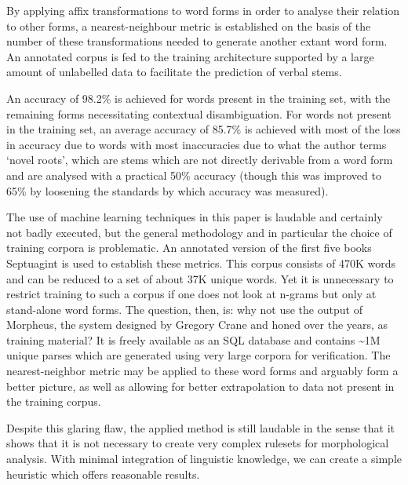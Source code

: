 By applying affix transformations to word forms in order to analyse
their relation to other forms, a nearest-neighbour metric is
established on the basis of the number of these transformations needed
to generate another extant word form. An annotated corpus is fed to
the training architecture supported by a large amount of unlabelled data to
facilitate the prediction of verbal stems.

An accuracy of 98.2\% is achieved for words present in the training
set, with the remaining forms necessitating contextual
disambiguation. For words not present in the training set, an average
accuracy of 85.7\% is achieved with most of the loss in accuracy due
to words with most inaccuracies due to what the author terms `novel
roots', which are stems which are not directly derivable from a word
form and are analysed with a practical 50\% accuracy (though this was
improved to 65\% by loosening the standards by which accuracy was
measured).

The use of machine learning techniques in this paper is laudable and
certainly not badly executed, but the general methodology and in
particular the choice of training corpora is problematic. An annotated
version of the first five books Septuagint is used to establish these
metrics. This corpus consists of 470K words and can be reduced to a
set of about 37K unique words. Yet it is unnecessary to restrict
training to such a corpus if one does not look at n-grams but only at
stand-alone word forms. The question, then, is: why not use the output
of Morpheus, the system designed by Gregory Crane and honed over the
years, as training material? It is freely available as an SQL database
and contains \textasciitilde1M unique parses which are generated using very large
corpora for verification. The nearest-neighbor metric may be applied
to these word forms and arguably form a better picture, as well as
allowing for better extrapolation to data not present in the training
corpus.

Despite this glaring flaw, the applied method is still laudable in the
sense that it shows that it is not necessary to create very complex
rulesets for morphological analysis. With minimal integration of
linguistic knowledge, we can create a simple heuristic which offers
reasonable results.